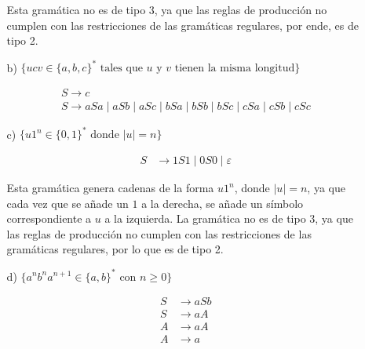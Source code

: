 \documentclass[12pt]{report} %
\begin{document}
\begin{ejercicio}
\begin{itemize}
\begin{itemize}
\begin{solucion}[media.a]
        Esta gramática no es de tipo 3, ya que las reglas de producción no cumplen con las restricciones de las gramáticas regulares, por ende, es de tipo 2.

        \end{solucion}

        \item[b)] $\{ucv \in \{a, b, c\}^* \text{ tales que } u \text{ y } v \text{ tienen la misma longitud}\}$
        
        \begin{solucion}[media.b]

        \begin{align*}
        S \rightarrow c \\
        S \rightarrow  aSa \mid aSb \mid aSc \mid bSa \mid bSb \mid bSc \mid cSa \mid cSb \mid cSc
        \end{align*}


        \end{solucion}

        \item[c)] $\{u1^n \in \{0, 1\}^* \text{ donde } |u| = n\}$
        

        \begin{solucion}[media.c]

        \begin{align*}
        S &\rightarrow 1S1 \mid 0S0 \mid \varepsilon
        \end{align*}

        Esta gramática genera cadenas de la forma $u1^n$, donde $|u| = n$, ya que cada vez que se añade un $1$ a la derecha, se añade un símbolo correspondiente a $u$ a la izquierda. La gramática no es de tipo 3, ya que las reglas de producción no cumplen con las restricciones de las gramáticas regulares, por lo que es de tipo 2.

        \end{solucion}

        
        \item[d)] $\{a^n b^n a^{n+1} \in \{a, b\}^* \text{ con } n \geq 0\}$


        \begin{solucion}[media.d]

        \begin{align*}
        S &\rightarrow aSb \\
        S &\rightarrow aA \\
        A &\rightarrow aA \\
        A &\rightarrow a
        \end{align*}


\end{solucion}
\end{itemize}
\end{itemize}
\end{ejercicio}
\end{document}
